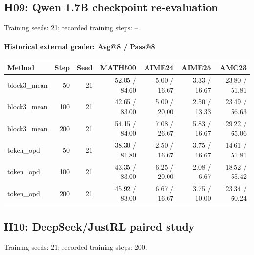 \subsection{H09: Qwen 1.7B checkpoint re-evaluation}
\label{history:qwen17_reeval}
Training seeds: 21; recorded training steps: --.
\paragraph{Historical external grader: Avg@8 / Pass@8}
{\footnotesize\setlength{\tabcolsep}{3.5pt}
\begin{longtable}{@{}p{1.4in}rrrrrr@{}}
\toprule
Method & Step & Seed & MATH500 & AIME24 & AIME25 & AMC23 \\
\midrule\endhead
block3\_\allowbreak{}mean & 50 & 21 & 52.05 / 84.60 & 5.00 / 16.67 & 3.33 / 16.67 & 23.80 / 51.81 \\
block3\_\allowbreak{}mean & 100 & 21 & 42.65 / 83.00 & 5.00 / 20.00 & 2.50 / 13.33 & 23.49 / 56.63 \\
block3\_\allowbreak{}mean & 200 & 21 & 54.15 / 84.00 & 7.08 / 26.67 & 5.83 / 16.67 & 29.22 / 65.06 \\
token\_\allowbreak{}opd & 50 & 21 & 38.30 / 81.80 & 2.50 / 16.67 & 3.75 / 16.67 & 14.61 / 51.81 \\
token\_\allowbreak{}opd & 100 & 21 & 43.35 / 83.00 & 6.25 / 20.00 & 2.08 / 6.67 & 18.52 / 55.42 \\
token\_\allowbreak{}opd & 200 & 21 & 45.92 / 83.00 & 6.67 / 16.67 & 3.75 / 10.00 & 23.34 / 60.24 \\
\bottomrule\end{longtable}
}
\subsection{H10: DeepSeek/JustRL paired study}
\label{history:deepseek_justrl}
Training seeds: 21; recorded training steps: 200.
